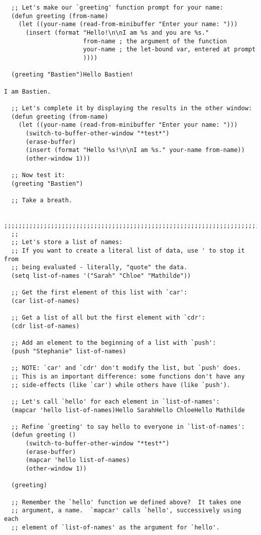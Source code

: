 \documentclass[11pt]{ctexart}
\begin{document}
{{{{\begin{lstlisting}
  ;; Let's make our `greeting' function prompt for your name:
  (defun greeting (from-name)
    (let ((your-name (read-from-minibuffer "Enter your name: ")))
      (insert (format "Hello!\n\nI am %s and you are %s."
                      from-name ; the argument of the function
                      your-name ; the let-bound var, entered at prompt
                      ))))

  (greeting "Bastien")Hello Bastien!

I am Bastien.

  ;; Let's complete it by displaying the results in the other window:
  (defun greeting (from-name)
    (let ((your-name (read-from-minibuffer "Enter your name: ")))
      (switch-to-buffer-other-window "*test*")
      (erase-buffer)
      (insert (format "Hello %s!\n\nI am %s." your-name from-name))
      (other-window 1)))

  ;; Now test it:
  (greeting "Bastien")

  ;; Take a breath.

  ;;;;;;;;;;;;;;;;;;;;;;;;;;;;;;;;;;;;;;;;;;;;;;;;;;;;;;;;;;;;;;;;;;;;;;;;
  ;;
  ;; Let's store a list of names:
  ;; If you want to create a literal list of data, use ' to stop it from
  ;; being evaluated - literally, "quote" the data.
  (setq list-of-names '("Sarah" "Chloe" "Mathilde"))

  ;; Get the first element of this list with `car':
  (car list-of-names)

  ;; Get a list of all but the first element with `cdr':
  (cdr list-of-names)

  ;; Add an element to the beginning of a list with `push':
  (push "Stephanie" list-of-names)

  ;; NOTE: `car' and `cdr' don't modify the list, but `push' does.
  ;; This is an important difference: some functions don't have any
  ;; side-effects (like `car') while others have (like `push').

  ;; Let's call `hello' for each element in `list-of-names':
  (mapcar 'hello list-of-names)Hello SarahHello ChloeHello Mathilde

  ;; Refine `greeting' to say hello to everyone in `list-of-names':
  (defun greeting ()
      (switch-to-buffer-other-window "*test*")
      (erase-buffer)
      (mapcar 'hello list-of-names)
      (other-window 1))

  (greeting)

  ;; Remember the `hello' function we defined above?  It takes one
  ;; argument, a name.  `mapcar' calls `hello', successively using each
  ;; element of `list-of-names' as the argument for `hello'.


\end{lstlisting}}}}}
\end{document}
